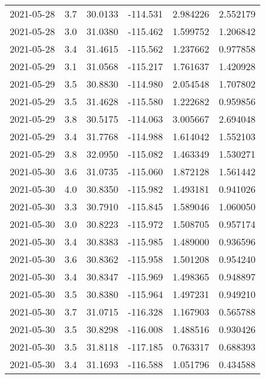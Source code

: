 \begin{tabular}{lrrrrr}
2021-05-28 &       3.7 &  30.0133 &  -114.531 &         2.984226 &         2.552179 \\
2021-05-28 &       3.0 &  31.0380 &  -115.462 &         1.599752 &         1.206842 \\
2021-05-28 &       3.4 &  31.4615 &  -115.562 &         1.237662 &         0.977858 \\
2021-05-29 &       3.1 &  31.0568 &  -115.217 &         1.761637 &         1.420928 \\
2021-05-29 &       3.5 &  30.8830 &  -114.980 &         2.054548 &         1.707802 \\
2021-05-29 &       3.5 &  31.4628 &  -115.580 &         1.222682 &         0.959856 \\
2021-05-29 &       3.8 &  30.5175 &  -114.063 &         3.005667 &         2.694048 \\
2021-05-29 &       3.4 &  31.7768 &  -114.988 &         1.614042 &         1.552103 \\
2021-05-29 &       3.8 &  32.0950 &  -115.082 &         1.463349 &         1.530271 \\
2021-05-30 &       3.6 &  31.0735 &  -115.060 &         1.872128 &         1.561442 \\
2021-05-30 &       4.0 &  30.8350 &  -115.982 &         1.493181 &         0.941026 \\
2021-05-30 &       3.3 &  30.7910 &  -115.845 &         1.589046 &         1.060050 \\
2021-05-30 &       3.0 &  30.8223 &  -115.972 &         1.508705 &         0.957174 \\
2021-05-30 &       3.4 &  30.8383 &  -115.985 &         1.489000 &         0.936596 \\
2021-05-30 &       3.6 &  30.8362 &  -115.958 &         1.501208 &         0.954240 \\
2021-05-30 &       3.4 &  30.8347 &  -115.969 &         1.498365 &         0.948897 \\
2021-05-30 &       3.5 &  30.8380 &  -115.964 &         1.497231 &         0.949210 \\
2021-05-30 &       3.7 &  31.0715 &  -116.328 &         1.167903 &         0.565788 \\
2021-05-30 &       3.5 &  30.8298 &  -116.008 &         1.488516 &         0.930426 \\
2021-05-30 &       3.5 &  31.8118 &  -117.185 &         0.763317 &         0.688393 \\
2021-05-30 &       3.4 &  31.1693 &  -116.588 &         1.051796 &         0.434588 \\

\end{tabular}
